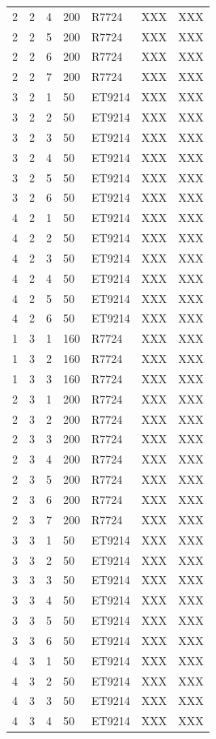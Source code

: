 \documentclass[3p,final,twocolumn]{elsarticle}
\begin{document}
\begin{table}[ht]
\begin{tabular}{  m{3em} | m{3em} | m{5em} | m{3em} | m{3em} | m{3em} | m{8em} }
2	&2	&4	&200	&R7724	&XXX	&XXX\\ 
2	&2	&5	&200	&R7724	&XXX	&XXX\\ 
2	&2	&6	&200	&R7724	&XXX	&XXX\\ 
2	&2	&7	&200	&R7724	&XXX	&XXX\\ 
3	&2	&1	&50	&ET9214	&XXX	&XXX\\ 
3	&2	&2	&50	&ET9214	&XXX	&XXX\\ 
3	&2	&3	&50	&ET9214	&XXX	&XXX\\ 
3	&2	&4	&50	&ET9214	&XXX	&XXX\\ 
3	&2	&5	&50	&ET9214	&XXX	&XXX\\ 
3	&2	&6	&50	&ET9214	&XXX	&XXX\\ 
4	&2	&1	&50	&ET9214	&XXX	&XXX\\ 
4	&2	&2	&50	&ET9214	&XXX	&XXX\\ 
4	&2	&3	&50	&ET9214	&XXX	&XXX\\ 
4	&2	&4	&50	&ET9214	&XXX	&XXX\\ 
4	&2	&5	&50	&ET9214	&XXX	&XXX\\ 
4	&2	&6	&50	&ET9214	&XXX	&XXX\\ 
1	&3	&1	&160	&R7724	&XXX	&XXX\\ 
1	&3	&2	&160	&R7724	&XXX	&XXX\\ 
1	&3	&3	&160	&R7724	&XXX	&XXX\\ 
2	&3	&1	&200	&R7724	&XXX	&XXX\\ 
2	&3	&2	&200	&R7724	&XXX	&XXX\\ 
2	&3	&3	&200	&R7724	&XXX	&XXX\\ 
2	&3	&4	&200	&R7724	&XXX	&XXX\\ 
2	&3	&5	&200	&R7724	&XXX	&XXX\\ 
2	&3	&6	&200	&R7724	&XXX	&XXX\\ 
2	&3	&7	&200	&R7724	&XXX	&XXX\\ 
3	&3	&1	&50	&ET9214	&XXX	&XXX\\ 
3	&3	&2	&50	&ET9214	&XXX	&XXX\\ 
3	&3	&3	&50	&ET9214	&XXX	&XXX\\ 
3	&3	&4	&50	&ET9214	&XXX	&XXX\\ 
3	&3	&5	&50	&ET9214	&XXX	&XXX\\ 
3	&3	&6	&50	&ET9214	&XXX	&XXX\\ 
4	&3	&1	&50	&ET9214	&XXX	&XXX\\ 
4	&3	&2	&50	&ET9214	&XXX	&XXX\\ 
4	&3	&3	&50	&ET9214	&XXX	&XXX\\ 
4	&3	&4	&50	&ET9214	&XXX	&XXX\\ 

\end{tabular}
\end{table}
\end{document}
